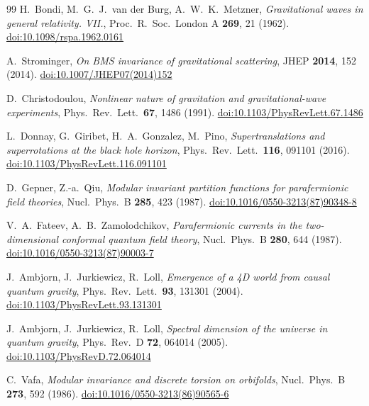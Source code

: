 \documentclass[11pt,a4paper]{article}
\begin{document}
\begin{thebibliography}{99}
  H.~Bondi, M.~G.~J.~van der Burg, A.~W.~K.~Metzner,
  \textit{Gravitational waves in general relativity. VII.},
  Proc.\ R.\ Soc.\ London A \textbf{269}, 21 (1962).
  \href{https://doi.org/10.1098/rspa.1962.0161}{doi:10.1098/rspa.1962.0161}

  A.~Strominger,
  \textit{On BMS invariance of gravitational scattering},
  JHEP \textbf{2014}, 152 (2014).
  \href{https://doi.org/10.1007/JHEP07(2014)152}{doi:10.1007/JHEP07(2014)152}

  D.~Christodoulou,
  \textit{Nonlinear nature of gravitation and gravitational-wave experiments},
  Phys.\ Rev.\ Lett.\ \textbf{67}, 1486 (1991).
  \href{https://doi.org/10.1103/PhysRevLett.67.1486}{doi:10.1103/PhysRevLett.67.1486}

  L.~Donnay, G.~Giribet, H.~A.~Gonzalez, M.~Pino,
  \textit{Supertranslations and superrotations at the black hole horizon},
  Phys.\ Rev.\ Lett.\ \textbf{116}, 091101 (2016).
  \href{https://doi.org/10.1103/PhysRevLett.116.091101}{doi:10.1103/PhysRevLett.116.091101}

  D.~Gepner, Z.-a.~Qiu,
  \textit{Modular invariant partition functions for parafermionic field theories},
  Nucl.\ Phys.\ B \textbf{285}, 423 (1987).
  \href{https://doi.org/10.1016/0550-3213(87)90348-8}{doi:10.1016/0550-3213(87)90348-8}

  V.~A.~Fateev, A.~B.~Zamolodchikov,
  \textit{Parafermionic currents in the two-dimensional conformal quantum field theory},
  Nucl.\ Phys.\ B \textbf{280}, 644 (1987).
  \href{https://doi.org/10.1016/0550-3213(87)90003-7}{doi:10.1016/0550-3213(87)90003-7}

  J.~Ambjorn, J.~Jurkiewicz, R.~Loll,
  \textit{Emergence of a 4D world from causal quantum gravity},
  Phys.\ Rev.\ Lett.\ \textbf{93}, 131301 (2004).
  \href{https://doi.org/10.1103/PhysRevLett.93.131301}{doi:10.1103/PhysRevLett.93.131301}

  J.~Ambjorn, J.~Jurkiewicz, R.~Loll,
  \textit{Spectral dimension of the universe in quantum gravity},
  Phys.\ Rev.\ D \textbf{72}, 064014 (2005).
  \href{https://doi.org/10.1103/PhysRevD.72.064014}{doi:10.1103/PhysRevD.72.064014}

  C.~Vafa,
  \textit{Modular invariance and discrete torsion on orbifolds},
  Nucl.\ Phys.\ B \textbf{273}, 592 (1986).
  \href{https://doi.org/10.1016/0550-3213(86)90565-6}{doi:10.1016/0550-3213(86)90565-6}


\end{thebibliography}
\end{document}
